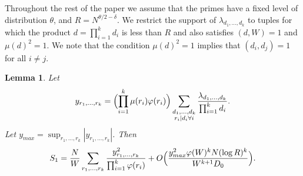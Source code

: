 \documentclass[12pt,a4paper]{amsart}
\theoremstyle{plain}
\newtheorem{lmm}[thrm]{Lemma}
\numberwithin{sblmm}{thrm}
\numberwithin{equation}{section}
\renewcommand{\phi}{\varphi}
\begin{document}
Throughout the rest of the paper we assume that the primes have a fixed level of distribution $\theta$, and $R=N^{\theta/2-\delta}$. We restrict the support of $\lambda_{d_1,\dotsc,d_k}$ to tuples for which the product $d=\prod_{i=1}^k d_i$ is less than $R$ and also satisfies $(d,W)=1$ and $\mu(d)^2=1$. We note that the condition $\mu(d)^2=1$ implies that $(d_i,d_j)=1$ for all $i\ne j$.
\begin{lmm}\label{lmm:S1Expression1}
Let
\[y_{r_1,\dotsc,r_k}=\Bigl(\prod_{i=1}^k\mu(r_i)\phi(r_i)\Bigr)\sum_{\substack{d_1,\dotsc,d_k\\ r_i|d_i\forall i}}\frac{\lambda_{d_1,\dotsc,d_k}}{\prod_{i=1}^kd_i}.\]
Let $y_{max}=\sup_{r_1,\dotsc,r_k}|y_{r_1,\dotsc,r_k}|$. Then
\[S_1=\frac{N}{W}\sum_{r_1,\dotsc,r_k}\frac{y_{r_1,\dotsc,r_k}^2}{\prod_{i=1}^k\phi(r_i)}+O\Bigl(\frac{y_{max}^2 \phi(W)^k N(\log{R})^k}{W^{k+1} D_0}\Bigr).\]
\end{lmm}
\end{document}
